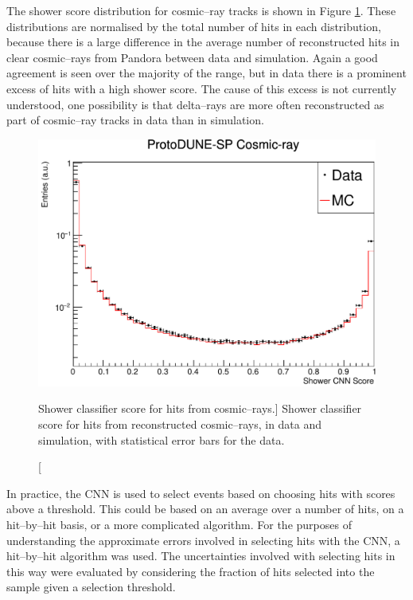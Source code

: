 The shower score distribution for cosmic--ray tracks is shown in Figure
\ref{fig:cosmic_muon_cnn}. These distributions are normalised by the total
number of hits in each distribution, because there is a large difference
in the average number of reconstructed hits in clear cosmic--rays from Pandora
between data and simulation. Again a good agreement is seen over the majority 
of the range, but in data there is a prominent excess of hits with a high 
shower score. The cause of this excess is not currently understood, one
possibility is that delta--rays are more often reconstructed as part of
cosmic--ray tracks in data than in simulation.

\begin{figure}
	\centering
	\includegraphics[width=\textwidth]{figures/hit_cnn_cosmics.pdf}
	\caption
	[Shower classifier score for hits from cosmic--rays.]
	{Shower classifier score for hits from reconstructed cosmic--rays, in data and
	simulation, with statistical error bars for the data.}
	\label{fig:cosmic_muon_cnn}
\end{figure}

In practice, the CNN is used to select events based on choosing hits with 
scores above a threshold. This could be based on an average over a number of 
hits, on a hit--by--hit basis, or a more complicated algorithm. For the purposes
of understanding the approximate errors involved in selecting hits with the CNN,
a hit--by--hit algorithm was used. The uncertainties involved with selecting 
hits in this way were evaluated by considering the fraction of hits selected 
into the sample given a selection threshold. 

